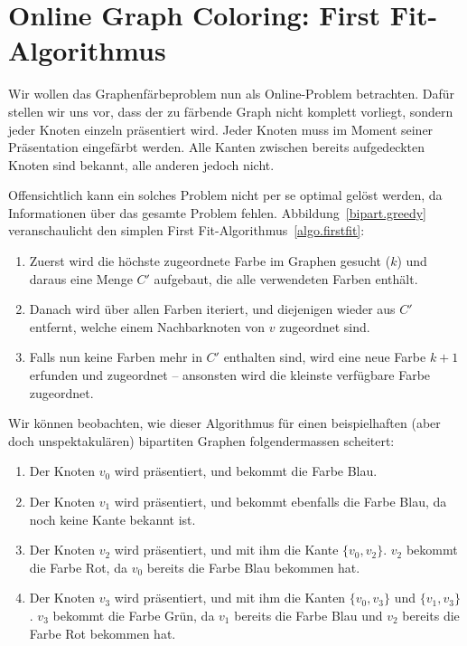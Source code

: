 \documentclass[11pt,abstracton]{scrreprt} %
\theoremstyle{definition}
\begin{document}
\section{Online Graph Coloring: First Fit-Algorithmus}

Wir wollen das Graphenfärbeproblem nun als Online-Problem betrachten. Dafür stellen wir uns vor, dass der zu färbende Graph nicht komplett vorliegt, sondern jeder Knoten einzeln präsentiert wird. Jeder Knoten muss im Moment seiner Präsentation eingefärbt werden. Alle Kanten zwischen bereits aufgedeckten Knoten sind bekannt, alle anderen jedoch nicht. \cite{lovasz}

Offensichtlich kann ein solches Problem nicht per se optimal gelöst werden, da Informationen über das gesamte Problem fehlen. Abbildung~\ref{bipart.greedy} veranschaulicht den simplen First Fit-Algorithmus~\ref{algo.firstfit}:
\begin{enumerate}
\item Zuerst wird die höchste zugeordnete Farbe im Graphen gesucht ($k$) und daraus eine Menge $C'$ aufgebaut, die alle verwendeten Farben enthält.
\item Danach wird über allen Farben iteriert, und diejenigen wieder aus $C'$ entfernt, welche einem Nachbarknoten von $v$  zugeordnet sind.
\item Falls nun keine Farben mehr in $C'$ enthalten sind, wird eine neue Farbe $k+1$ erfunden und zugeordnet -- ansonsten wird die kleinste verfügbare Farbe zugeordnet.
\end{enumerate}

Wir können beobachten, wie dieser Algorithmus für einen beispielhaften (aber doch unspektakulären) bipartiten Graphen folgendermassen scheitert:
\begin{enumerate}
\item Der Knoten $v_0$ wird präsentiert, und bekommt die Farbe Blau.
\item Der Knoten $v_1$ wird präsentiert, und bekommt ebenfalls die Farbe Blau, da noch keine Kante bekannt ist.
\item Der Knoten $v_2$ wird präsentiert, und mit ihm die Kante $\{v_0, v_2\}$. $v_2$ bekommt die Farbe Rot, da $v_0$ bereits die Farbe Blau bekommen hat.
\item Der Knoten $v_3$ wird präsentiert, und mit ihm die Kanten $\{v_0, v_3\}$ und $\{v_1, v_3\}$. $v_3$ bekommt die Farbe Grün, da $v_1$ bereits die Farbe Blau und $v_2$ bereits die Farbe Rot bekommen hat.
\end{enumerate}
\end{document}
